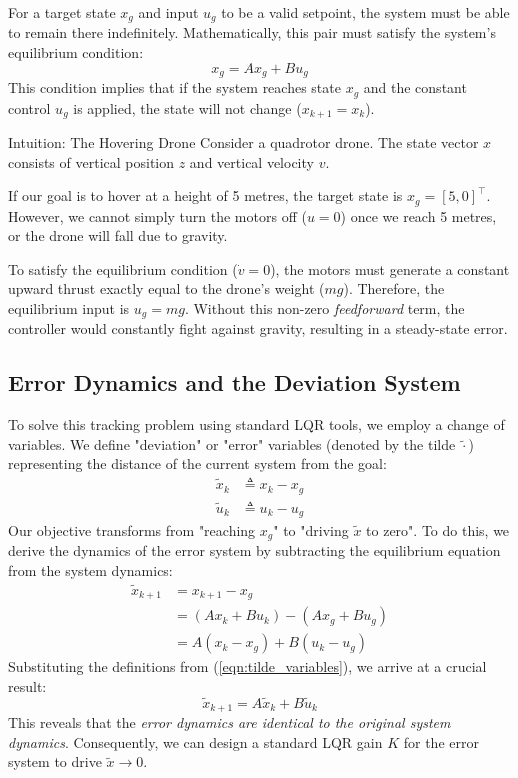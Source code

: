 For a target state $x_g$ and input $u_g$ to be a valid setpoint, the system must be able to remain there indefinitely. Mathematically, this pair must satisfy the system's equilibrium condition:
\begin{equation} \label{eqn:EquilibriumCondition}
	x_g = A x_g + B u_g
\end{equation}
This condition implies that if the system reaches state $x_g$ and the constant control $u_g$ is applied, the state will not change ($x_{k+1} = x_k$).

\begin{examplebox}{Intuition: The Hovering Drone}
	Consider a quadrotor drone. The state vector $x$ consists of vertical position $z$ and vertical velocity $v$.
	
	If our goal is to hover at a height of 5 metres, the target state is $x_g = [5, 0]^\top$. However, we cannot simply turn the motors off ($u=0$) once we reach 5 metres, or the drone will fall due to gravity. 
	
	To satisfy the equilibrium condition ($\dot{v} = 0$), the motors must generate a constant upward thrust exactly equal to the drone's weight ($mg$). Therefore, the equilibrium input is $u_g = mg$. Without this non-zero \emph{feedforward} term, the controller would constantly fight against gravity, resulting in a steady-state error.
\end{examplebox}

\subsection{Error Dynamics and the Deviation System}
To solve this tracking problem using standard LQR tools, we employ a change of variables. We define "deviation" or "error" variables (denoted by the tilde $\tilde{\cdot}$) representing the distance of the current system from the goal:
\begin{align}\label{eqn:tilde_variables}
	\tilde{x}_k &\triangleq x_k - x_g \nonumber \\
	\tilde{u}_k &\triangleq u_k - u_g
\end{align}
Our objective transforms from "reaching $x_g$" to "driving $\tilde{x}$ to zero". To do this, we derive the dynamics of the error system by subtracting the equilibrium equation from the system dynamics:
\begin{align*}
	\tilde{x}_{k+1} &= x_{k+1} - x_g \nonumber \\
	&= (A x_k + B u_k) - (A x_g + B u_g) \nonumber  \\
	&= A(x_k - x_g) + B(u_k - u_g)
\end{align*}
Substituting the definitions from (\ref{eqn:tilde_variables}), we arrive at a crucial result:
\begin{equation*}
	\tilde{x}_{k+1} = A \tilde{x}_k + B \tilde{u}_k
\end{equation*}
This reveals that the \emph{error dynamics are identical to the original system dynamics}. Consequently, we can design a standard LQR gain $K$ for the error system to drive $\tilde{x} \to 0$.

